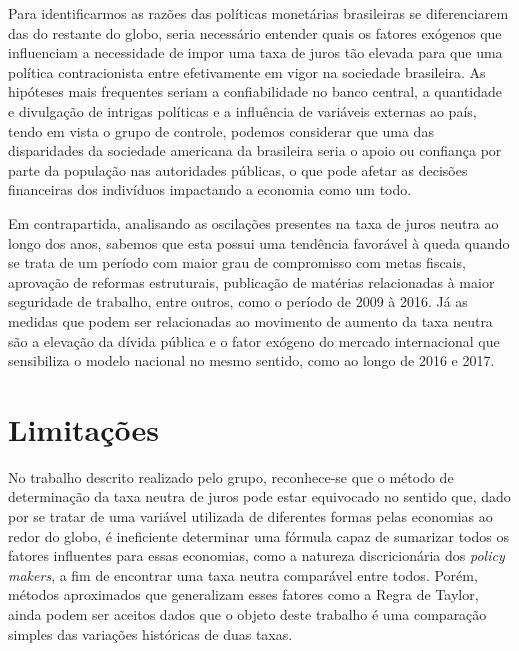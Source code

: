  Para identificarmos as raz\~{o}es das pol\'{i}ticas monet\'{a}rias brasileiras se diferenciarem das do restante do globo, seria necess\'{a}rio entender quais os fatores ex\'{o}genos que influenciam a necessidade de impor uma taxa de juros t\~{a}o elevada para que uma pol\'{i}tica contracionista entre efetivamente em vigor na sociedade brasileira. As hip\'{o}teses mais frequentes seriam a confiabilidade no banco central, a quantidade e divulga\c{c}\~{a}o de intrigas pol\'{i}ticas e a influ\^{e}ncia de vari\'{a}veis externas ao pa\'{i}s, tendo em vista o grupo de controle, podemos considerar que uma das disparidades da sociedade americana da brasileira seria o apoio ou confian\c{c}a por parte da popula\c{c}\~{a}o nas autoridades p\'{u}blicas, o que pode afetar as decis\~{o}es financeiras dos indiv\'{i}duos impactando a economia como um todo. 

 Em contrapartida, analisando as oscila\c{c}\~{o}es presentes na taxa de juros neutra ao longo dos anos, sabemos que esta possui uma tend\^{e}ncia favor\'{a}vel \`{a} queda quando se trata de um per\'{i}odo com maior grau de compromisso com metas fiscais, aprova\c{c}\~{a}o de reformas estruturais, publica\c{c}\~{a}o de mat\'{e}rias relacionadas \`{a} maior seguridade de trabalho, entre outros, como o per\'{i}odo de 2009 \`{a} 2016. J\'{a} as medidas que podem ser relacionadas ao movimento de aumento da taxa neutra s\~{a}o a eleva\c{c}\~{a}o da d\'{i}vida p\'{u}blica e o fator ex\'{o}geno do mercado internacional que sensibiliza o modelo nacional no mesmo sentido, como ao longo de 2016 e 2017.  

\noindent 

\section*{Limita\c{c}\~{o}es }

\noindent 

 No trabalho descrito realizado pelo grupo, reconhece-se que o m\'{e}todo de determina\c{c}\~{a}o da taxa neutra de juros pode estar equivocado no sentido que, dado por se tratar de uma vari\'{a}vel utilizada de diferentes formas pelas economias ao redor do globo, \'{e} ineficiente determinar uma f\'{o}rmula capaz de sumarizar todos os fatores influentes para essas economias, como a natureza discricion\'{a}ria dos \textit{policy makers}, a fim de encontrar uma taxa neutra compar\'{a}vel entre todos. Por\'{e}m, m\'{e}todos aproximados que generalizam esses fatores como a Regra de Taylor, ainda podem ser aceitos dados que o objeto deste trabalho \'{e} uma compara\c{c}\~{a}o simples das varia\c{c}\~{o}es hist\'{o}ricas de duas taxas. 


